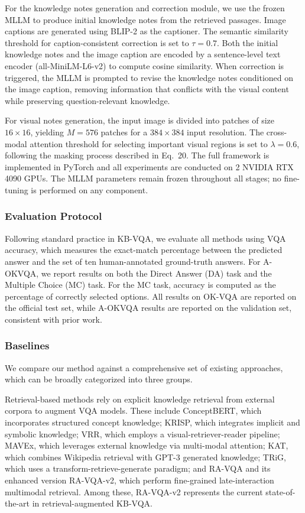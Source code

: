 \documentclass[manuscript,screen,review]{acmart}
\begin{document}
For the knowledge notes generation and correction module, we use the frozen MLLM to produce initial knowledge notes from the retrieved passages. Image captions are generated using BLIP-2 as the captioner. The semantic similarity threshold for caption-consistent correction is set to $\tau=0.7$. Both the initial knowledge notes and the image caption are encoded by a sentence-level text encoder (all-MiniLM-L6-v2) to compute cosine similarity. When correction is triggered, the MLLM is prompted to revise the knowledge notes conditioned on the image caption, removing information that conflicts with the visual content while preserving question-relevant knowledge.

For visual notes generation, the input image is divided into patches of size $16\times16$, yielding $M=576$ patches for a $384\times384$ input resolution. The cross-modal attention threshold for selecting important visual regions is set to $\lambda=0.6$, following the masking process described in Eq.~20. The full framework is implemented in PyTorch and all experiments are conducted on 2 NVIDIA RTX 4090 GPUs. The MLLM parameters remain frozen throughout all stages; no fine-tuning is performed on any component.

\subsubsection{Evaluation Protocol}

Following standard practice in KB-VQA, we evaluate all methods using VQA accuracy, which measures the exact-match percentage between the predicted answer and the set of ten human-annotated ground-truth answers. For A-OKVQA, we report results on both the Direct Answer (DA) task and the Multiple Choice (MC) task. For the MC task, accuracy is computed as the percentage of correctly selected options. All results on OK-VQA are reported on the official test set, while A-OKVQA results are reported on the validation set, consistent with prior work.

\subsubsection{Baselines}

We compare our method against a comprehensive set of existing approaches, which can be broadly categorized into three groups.

Retrieval-based methods rely on explicit knowledge retrieval from external corpora to augment VQA models. These include ConceptBERT, which incorporates structured concept knowledge; KRISP, which integrates implicit and symbolic knowledge; VRR, which employs a visual-retriever-reader pipeline; MAVEx, which leverages external knowledge via multi-modal attention; KAT, which combines Wikipedia retrieval with GPT-3 generated knowledge; TRiG, which uses a transform-retrieve-generate paradigm; and RA-VQA and its enhanced version RA-VQA-v2, which perform fine-grained late-interaction multimodal retrieval. Among these, RA-VQA-v2 represents the current state-of-the-art in retrieval-augmented KB-VQA.
\end{document}
